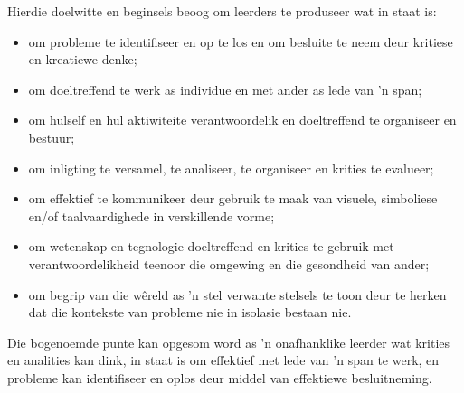 Hierdie doelwitte en beginsels beoog om leerders te produseer wat in
staat is:
\begin{itemize}[noitemsep]
\item
  om probleme te identifiseer en op te los en om besluite te neem deur
  kritiese en kreatiewe denke;
\item
  om doeltreffend te werk as individue en met ander as lede van 'n
  span;
\item
  om hulself en hul aktiwiteite verantwoordelik en doeltreffend te
  organiseer en bestuur;
\item
  om inligting te versamel, te analiseer, te organiseer en krities te
  evalueer;
\item
  om effektief te kommunikeer deur gebruik te maak van visuele,
  simboliese en/of taalvaardighede in verskillende vorme;
\item
  om wetenskap en tegnologie doeltreffend en krities te gebruik met
  verantwoordelikheid teenoor die omgewing en die gesondheid van
  ander;
\item
  om begrip van die wêreld as 'n stel verwante stelsels te toon deur
  te herken dat die kontekste van probleme nie in isolasie bestaan
  nie.
\end{itemize}
Die bogenoemde punte kan opgesom word as 'n onafhanklike leerder wat
krities en analities kan dink, in staat is om effektief met lede van
'n span te werk, en probleme kan identifiseer en oplos deur middel van
effektiewe besluitneming.
